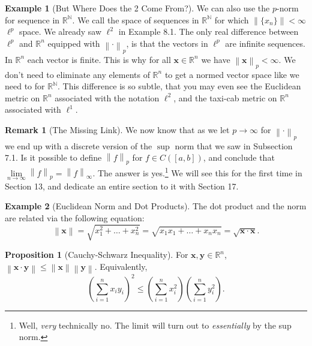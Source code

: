 \documentclass{article}
\newcommand{\N}{\mathbb{N}}
\newcommand{\R}{\mathbb{R}}
\newcommand{\x}{\mathbf{x}}
\newcommand{\y}{\mathbf{y}}
\newcommand{\norm}[1]{\left\lVert#1\right\rVert}
\theoremstyle{definition}
\newtheorem{proposition}{Proposition}[section]
\newtheorem{example}{Example}[section]
\newtheorem{remark}{Remark}[section]
\begin{document}
\begin{example}[But Where Does the 2 Come From?]
		
		We can also use the $ p $-norm for sequence in $ \R^\N $. We call the space of sequences in $ \R^\N $ for which $ \norm{\{x_n\}}<\infty $ $ \ell^p $ space. We already saw $ \ell^2 $ in Example 8.1. The only real difference between $ \ell^p $ and $ \R^n $ equipped with $ \norm{\cdot}_p $, is that the vectors in $ \ell^p $ are infinite sequences. In $ \R^n $ each vector is finite. This is why for all $ \x\in\R^n $ we have $ \norm{\x}_p<\infty $. We don't need to eliminate any elements of $ \R^n $ to get a normed vector space like we need to for $ \R^\N $. This difference is so subtle, that you may even see the Euclidean metric on $ \R^n $ associated with the notation $ \ell^2 $, and the taxi-cab metric on $ \R^n $ associated with $ \ell^1 $.  
	\end{example}
	\begin{remark}[The Missing Link]
		We now know that as we let $ p\to\infty $ for $ \norm{\cdot}_p $ we end up with a discrete version of the $ \sup $ norm that we saw in Subsection 7.1. Is it possible to define $ \norm{f}_p $ for $ f\in C([a,b]) $, and conclude that $ \lim\limits_{n\to\infty}\norm{f}_p=\norm{f}_\infty $. The answer is yes.\footnote{Well, \textit{very} technically no. The limit will turn out to \textit{essentially} by the sup norm.} We will see this for the first time in Section 13, and dedicate an entire section to it with Section 17.
	\end{remark}
	\begin{example}[Euclidean Norm and Dot Products]
		The dot product and the norm are related via the following equation:
		$$ \norm{\x}=\sqrt{x_1^2+\ldots+x_n^2}=\sqrt{x_1x_1+\ldots+x_nx_n}=\sqrt{\x\cdot\x}.$$
	\end{example}
	\begin{proposition}[Cauchy-Schwarz Inequality]
		For $ \x,\y\in\R^n $, $\norm{\x\cdot\y}\le \norm{\x}\norm{\y} $. Equivalently, 
		$$ \left(\sum_{i=1}^{n}x_iy_i\right)^2\le \left(\sum_{i=1}^n x_i^2\right)\left(\sum_{i=1}^n y_i^2\right).$$
	\end{proposition}
\end{document}
